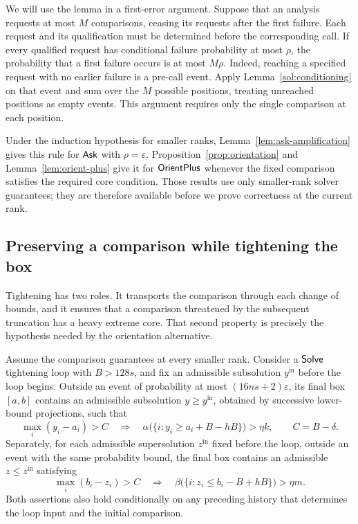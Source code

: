We will use the lemma in a first-error argument. Suppose that an
analysis requests at most \(M\) comparisons, ceasing its requests
after the first failure. Each request and its qualification must be
determined before the corresponding call. If every qualified request
has conditional failure probability at most \(\rho\), the probability
that a first failure occurs is at most \(M\rho\). Indeed, reaching a
specified request with no earlier failure is a pre-call event. Apply
Lemma~\ref{sol:conditioning} on that event and sum over the \(M\)
possible positions, treating unreached positions as empty events.
This argument requires only the single comparison at each position.

Under the induction hypothesis for smaller ranks,
Lemma~\ref{lem:ask-amplification} gives this rule for \(\mathsf{Ask}\) with
\(\rho=\varepsilon\). Proposition~\ref{prop:orientation} and
Lemma~\ref{lem:orient-plus} give it for \(\mathsf{OrientPlus}\) whenever the
fixed comparison satisfies the required core condition. Those results
use only smaller-rank solver guarantees; they are therefore available
before we prove correctness at the current rank.

\subsection{Preserving a comparison while tightening the box}

Tightening has two roles. It transports the comparison through each
change of bounds, and it ensures that a comparison threatened by the
subsequent truncation has a heavy extreme core. That second property
is precisely the hypothesis needed by the orientation alternative.

\begin{lemma}
\label{sol:tightening}
Assume the comparison guarantees at every smaller rank. Consider a
\(\mathsf{Solve}\) tightening loop with \(B>128s\), and fix an admissible
subsolution \(y^{\mathrm{in}}\) before the loop begins. Outside an
event of probability at most \((16ns+2)\varepsilon\), its final box
\([a,b]\) contains an admissible subsolution
\(y\ge y^{\mathrm{in}}\), obtained by successive lower-bound
projections, such that
\begin{equation}
 \max_i(y_i-a_i)>C
 \quad\Longrightarrow\quad
 \alpha\bigl(\{i:y_i\ge a_i+B-hB\}\bigr)>\eta k,
 \qquad C=B-\delta.
 \label{sol:tightened-high-core}
\end{equation}
Separately, for each admissible supersolution
\(z^{\mathrm{in}}\) fixed before the loop, outside an event with the
same probability bound, the final box contains an admissible
\(z\le z^{\mathrm{in}}\) satisfying
\begin{equation}
 \max_i(b_i-z_i)>C
 \quad\Longrightarrow\quad
 \beta\bigl(\{i:z_i\le b_i-B+hB\}\bigr)>\eta m.
 \label{sol:tightened-low-core}
\end{equation}
Both assertions also hold conditionally on any preceding history that
determines the loop input and the initial comparison.
\end{lemma}


